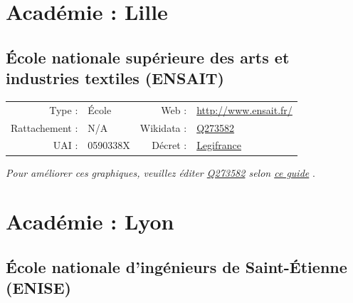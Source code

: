 \documentclass[11pt,french,landscape]{article}
\begin{document}
\newpage

\hypertarget{acaduxe9mie-lille-1}{%
\section{Académie : Lille}\label{acaduxe9mie-lille-1}}

\hypertarget{uxe9cole-nationale-supuxe9rieure-des-arts-et-industries-textiles-ensait}{%
\subsection{École nationale supérieure des arts et industries textiles
(ENSAIT)}\label{uxe9cole-nationale-supuxe9rieure-des-arts-et-industries-textiles-ensait}}

\begin{tabular*}{0.45\textwidth}{rp{2cm}rl}  
\hline  
Type : & École & Web : &\href{http://www.ensait.fr/}{http://www.ensait.fr/} \\  
Rattachement : & N/A & Wikidata : & \href{https://www.wikidata.org/entity/Q273582}{Q273582} \\  
UAI : & 0590338X & Décret : & \href{http://www.legifrance.gouv.fr/affichTexte.do?dateTexte=&categorieLien=id&cidTexte=JORFTEXT000000246728&fastPos=1&fastReqId=421881616&oldAction=rechExpTexteJorf}{Legifrance} \\  
\hline  
\end{tabular*}

\textit{\scriptsize Pour améliorer ces graphiques, veuillez éditer \href{https://www.wikidata.org/entity/Q273582}{Q273582}  selon \href{https://github.com/cpesr/wikidataESR/blob/master/Rmd/wikidataESR.md}{ce guide}}
.


\newpage

\hypertarget{acaduxe9mie-lyon-2}{%
\section{Académie : Lyon}\label{acaduxe9mie-lyon-2}}

\hypertarget{uxe9cole-nationale-dinguxe9nieurs-de-saint-uxe9tienne-enise}{%
\subsection{École nationale d'ingénieurs de Saint-Étienne
(ENISE)}\label{uxe9cole-nationale-dinguxe9nieurs-de-saint-uxe9tienne-enise}}
\end{document}
